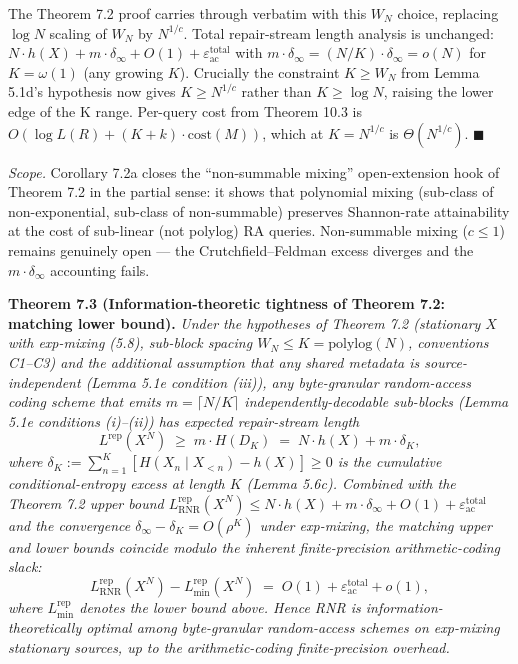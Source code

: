 \documentclass[
]{article}
\begin{document}
The Theorem 7.2 proof carries through verbatim with this $W_N$ choice,
replacing $\log N$ scaling of $W_N$ by $N^{1/c}$. Total repair-stream
length analysis is unchanged: $N \cdot h(X) + m \cdot \delta_\infty +
O(1) + \varepsilon_{\mathrm{ac}}^{\mathrm{total}}$ with
$m \cdot \delta_\infty = (N/K) \cdot \delta_\infty = o(N)$ for
$K = \omega(1)$ (any growing $K$). Crucially the constraint
$K \geq W_N$ from Lemma 5.1d's hypothesis now gives
$K \geq N^{1/c}$ rather than $K \geq \log N$, raising the lower edge
of the K range. Per-query cost from Theorem 10.3 is
$O(\log L(R) + (K+k) \cdot \mathrm{cost}(M))$, which at $K = N^{1/c}$
is $\Theta(N^{1/c})$.
\hfill$\blacksquare$

\emph{Scope.} Corollary 7.2a closes the ``non-summable mixing''
open-extension hook of Theorem 7.2 in the partial sense: it shows
that polynomial mixing (sub-class of non-exponential, sub-class of
non-summable) preserves Shannon-rate attainability at the cost of
sub-linear (not polylog) RA queries. Non-summable mixing ($c \leq 1$)
remains genuinely open --- the Crutchfield--Feldman excess diverges
and the $m \cdot \delta_\infty$ accounting fails.

\textbf{Theorem 7.3 (Information-theoretic tightness of Theorem 7.2:
matching lower bound).} \emph{Under the hypotheses of Theorem 7.2
(stationary $X$ with exp-mixing (5.8), sub-block spacing
$W_N \leq K = \mathrm{polylog}(N)$, conventions C1--C3) and the
additional assumption that any shared metadata is source-independent
(Lemma 5.1e condition (iii)), any byte-granular random-access coding
scheme that emits $m = \lceil N/K \rceil$ independently-decodable
sub-blocks (Lemma 5.1e conditions (i)--(ii)) has expected
repair-stream length}
\[
L^{\mathrm{rep}}(X^N) \;\geq\; m \cdot H(D_K) \;=\; N \cdot h(X) + m \cdot \delta_K,
\]
\emph{where $\delta_K := \sum_{n=1}^K [H(X_n \mid X_{<n}) - h(X)] \geq 0$
is the cumulative conditional-entropy excess at length $K$
(Lemma 5.6c). Combined with the Theorem 7.2 upper bound
$L^{\mathrm{rep}}_{\mathrm{RNR}}(X^N) \leq N \cdot h(X) +
m \cdot \delta_\infty + O(1) + \varepsilon_{\mathrm{ac}}^{\mathrm{total}}$
and the convergence $\delta_\infty - \delta_K = O(\rho^K)$ under
exp-mixing, the matching upper and lower bounds coincide modulo
the inherent finite-precision arithmetic-coding slack:}
\[
L^{\mathrm{rep}}_{\mathrm{RNR}}(X^N) - L^{\mathrm{rep}}_{\min}(X^N)
\;=\; O(1) + \varepsilon_{\mathrm{ac}}^{\mathrm{total}} + o(1),
\]
\emph{where $L^{\mathrm{rep}}_{\min}$ denotes the lower bound above.
Hence RNR is information-theoretically optimal among byte-granular
random-access schemes on exp-mixing stationary sources, up to the
arithmetic-coding finite-precision overhead.}
\end{document}

